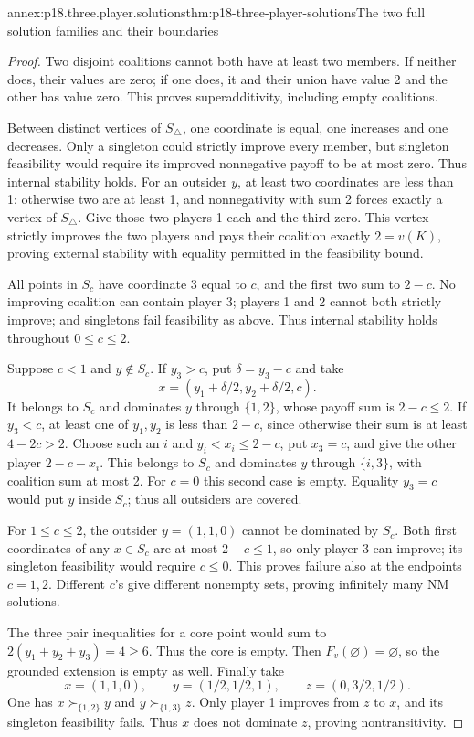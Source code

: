 \begin{annexitem}{annex:p18.three.player.solutions}{thm:p18-three-player-solutions}{The two full solution families and their boundaries}
\begin{proof}
Two disjoint coalitions cannot both have at least two
members. If neither does, their values are zero;
if one does, it and their union have value 2
and the other has value zero. This proves
superadditivity, including empty coalitions.

Between distinct vertices of \(S_\triangle\),
one coordinate is equal, one increases and
one decreases. Only a singleton could
strictly improve every member, but singleton
feasibility would require its improved
nonnegative payoff to be at most zero.
Thus internal stability holds. For an
outsider \(y\), at least two coordinates
are less than 1: otherwise two are
at least 1, and nonnegativity with
sum 2 forces exactly a vertex of
\(S_\triangle\). Give those two players
1 each and the third zero. This
vertex strictly improves the two
players and pays their coalition
exactly \(2=v(K)\), proving external
stability with equality permitted
in the feasibility bound.

All points in \(S_c\) have coordinate
3 equal to \(c\), and the first
two sum to \(2-c\). No improving
coalition can contain player 3;
players 1 and 2 cannot both
strictly improve; and singletons
fail feasibility as above.
Thus internal stability holds
throughout \(0\leq c\leq2\).

Suppose \(c<1\) and \(y\notin S_c\).
If \(y_3>c\), put \(\delta=y_3-c\)
and take
\[
                       x=(y_1+\delta/2,y_2+\delta/2,c).
\]
It belongs to \(S_c\) and
dominates \(y\) through \(\{1,2\}\),
whose payoff sum is \(2-c\leq2\).
If \(y_3<c\), at least one
of \(y_1,y_2\) is less than
\(2-c\), since otherwise their
sum is at least \(4-2c>2\).
Choose such an \(i\) and
\(y_i<x_i\leq2-c\), put \(x_3=c\),
and give the other player
\(2-c-x_i\). This belongs to
\(S_c\) and dominates \(y\)
through \(\{i,3\}\), with
coalition sum at most 2.
For \(c=0\) this second
case is empty. Equality
\(y_3=c\) would put \(y\)
inside \(S_c\); thus all
outsiders are covered.

For \(1\leq c\leq2\), the
outsider \(y=(1,1,0)\) cannot
be dominated by \(S_c\).
Both first coordinates of
any \(x\in S_c\) are at
most \(2-c\leq1\), so
only player 3 can improve;
its singleton feasibility
would require \(c\leq0\).
This proves failure also
at the endpoints \(c=1,2\).
Different \(c\)'s give
different nonempty sets,
proving infinitely many
NM solutions.

The three pair inequalities
for a core point would
sum to \(2(y_1+y_2+y_3)=4\geq6\).
Thus the core is empty.
Then \(F_v(\varnothing)=\varnothing\),
so the grounded extension
is empty as well.
Finally take
\[
 x=(1,1,0),\qquad y=(1/2,1/2,1),\qquad z=(0,3/2,1/2).
\]
One has \(x\succ_{\{1,2\}}y\)
and \(y\succ_{\{1,3\}}z\).
Only player 1 improves
from \(z\) to \(x\), and
its singleton feasibility
fails. Thus \(x\) does
not dominate \(z\),
proving nontransitivity.
\end{proof}
\end{annexitem}

